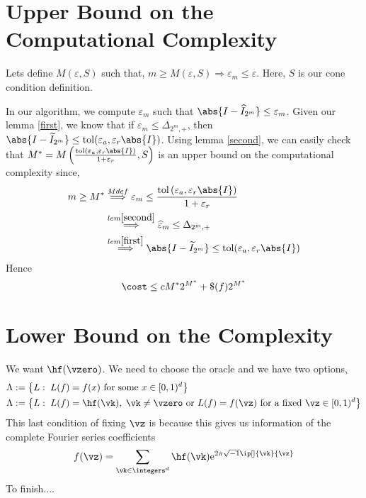 \documentclass[]{elsarticle}
\theoremstyle{definition}
\newcommand{\cube}{[0,1)^d}
\newcommand{\tol}{\text{tol}}
\newcommand{\e}{\text{e}}
\begin{document}
\section{Upper Bound on the Computational Complexity}
Lets define $M(\varepsilon,S)$ such that, $m\geq M(\varepsilon,S)\Rightarrow {\varepsilon}_m\leq \varepsilon$. Here, $S$ is our cone condition definition.

In our algorithm, we compute ${\varepsilon}_m$ such that $\abs{I-\widehat{I}_{2^m}}\leq {\varepsilon}_m$. Given our lemma \eqref{first}, we know that if ${\varepsilon}_m\leq \Delta_{2^m,+}$, then $\abs{I-\widetilde{I}_{2^m}}\leq \tol(\varepsilon_a,\varepsilon_r\abs{I})$. Using lemma \eqref{second}, we can easily check that $M^*=M\left(\frac{\tol\left(\varepsilon_a,\varepsilon_r\abs{I}\right)}{1+\varepsilon_r},S\right)$ is an upper bound on the computational complexity since,
\begin{align*}
m\geq M^*&\stackrel{M def}{\Longrightarrow} {\varepsilon}_m\leq\frac{\tol\left(\varepsilon_a,\varepsilon_r\abs{I}\right)}{1+\varepsilon_r}\\
&\stackrel{lem \eqref{second}}{\Longrightarrow}\widehat{\varepsilon}_m\leq \Delta_{2^m,+}\\
&\stackrel{lem \eqref{first}}{\Longrightarrow} \abs{I-\widetilde{I}_{2^m}}\leq \tol(\varepsilon_a,\varepsilon_r\abs{I})
\end{align*}
Hence
\[
\cost \leq cM^*2^{M^*}+\$(f)2^{M^*}
\]

\section{Lower Bound on the Complexity}
We want $\hf(\vzero)$. We need to choose the oracle and we have two options,
\begin{align*}
&\Lambda:=\left\{L:\; L(f)=f(x)\text{ for some }x\in\cube\right\}\\
&\Lambda:=\left\{L:\; L(f)=\hf(\vk),\;\vk\neq\vzero\text{ or }L(f)=f(\vz)\text{ for a fixed }\vz\in\cube\right\}\\
\end{align*}
This last condition of fixing $\vz$ is because this gives us information of the complete Fourier series coefficients
\[
f(\vz)=\sum_{\vk\in\integers^d}\hf(\vk)\e^{2\pi\sqrt{-1}\ip[]{\vk}{\vz}}
\]
To finish....
\end{document}
